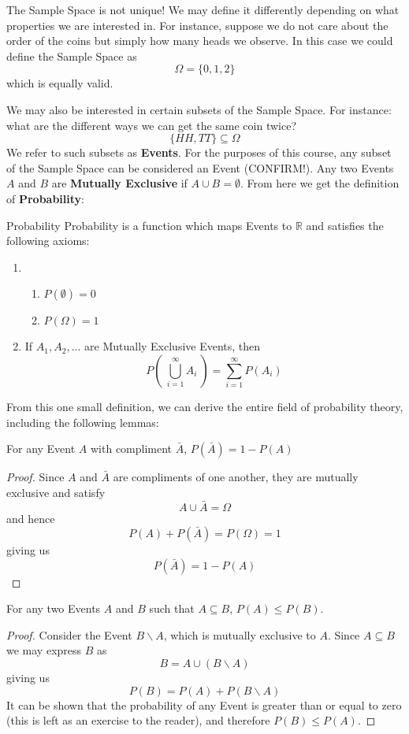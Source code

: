 \documentclass{report}
\begin{document}
\begin{notsofast}
The Sample Space is not unique! We may define it differently depending on what properties we are interested in. For instance, suppose we do not care about the order of the coins but simply how many heads we observe. In this case we could define the Sample Space as
\[
    \Omega=\{0,1,2\}
\]
which is equally valid.
\end{notsofast}
We may also be interested in certain subsets of the Sample Space. For instance: what are the different ways we can get the same coin twice?
\[
    \{HH,TT\}\subseteq \Omega
\]
We refer to such subsets as \textbf{Events}. For the purposes of this course, any subset of the Sample Space can be considered an Event (\todo CONFIRM!). Any two Events $A$ and $B$ are \textbf{Mutually Exclusive} if $A\cup B=\emptyset$. From here we get the definition of \textbf{Probability}:
\begin{definition}{Probability}
Probability is a function which maps Events to $\mathbb R$ and satisfies the following axioms:
\begin{enumerate}
    \item 
    \begin{enumerate}
        \item $P(\emptyset) = 0$
        \item $P(\Omega)=1$
    \end{enumerate}
    \item If $A_1, A_2,...$ are Mutually Exclusive Events, then
    \[
        P\left(\ \bigcup_{i=1}^\infty A_i\ \right) = \sum_{i=1}^\infty P(A_i)
    \]
\end{enumerate}
\end{definition}
\label{def:probability}
From this one small definition, we can derive the entire field of probability theory, including the following lemmas:

\begin{lemma}
    For any Event $A$ with compliment $\bar A$, $P(\bar A)=1-P(A)$
\tcblower
\begin{proof}
    Since $A$ and $\bar A$ are compliments of one another, they are mutually exclusive and satisfy
    \[
        A\cup \bar A = \Omega
    \]
    and hence
    \[
        P(A)+P(\bar A) = P(\Omega) = 1
    \]
    giving us
    \[
        P(\bar A)=1-P(A)
    \]
\end{proof}
\end{lemma}

\begin{lemma}
    For any two Events $A$ and $B$ such that $A\subseteq B$, $P(A)\le P(B)$.
    \tcblower
    \begin{proof}
    Consider the Event $B\backslash A$, which is mutually exclusive to $A$. Since $A\subseteq B$ we may express $B$ as
    \[
        B=A\cup (B\backslash A)
    \]
    giving us
    \[
        P(B)=P(A)+P(B\backslash A)
    \]
    It can be shown that the probability of any Event is greater than or equal to zero (this is left as an exercise to the reader), and therefore $P(B)\le P(A)$.
    \end{proof}
\end{lemma}
\end{document}
